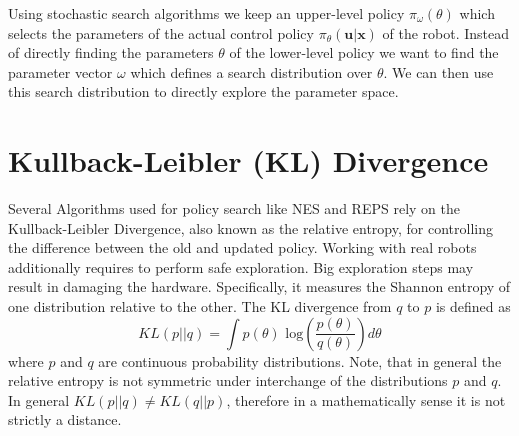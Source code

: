 Using stochastic search algorithms we keep an upper-level policy
$\pi_{\omega}(\theta)$ which selects the parameters of the
actual control policy $\pi_{\theta}(\mathbf{u} | \mathbf{x})$ of the robot.
Instead of directly finding the parameters $\theta$ of the
lower-level policy we want to find the parameter vector $\omega$ which
defines a search distribution over $\theta$. We can then use this
search distribution to directly explore the parameter space.


\section{Kullback-Leibler (KL) Divergence}
Several Algorithms used for policy search like
NES \citep{wierstra2014natural} and REPS \citep{peters2010relative}
rely on the Kullback-Leibler Divergence, also
known as the relative entropy, for controlling
the difference between the old and updated policy.
Working with real robots additionally requires to perform safe exploration. Big
exploration steps may result in damaging the hardware.
Specifically, it measures the Shannon entropy of one distribution relative to the
other. The KL divergence from $q$ to $p$ is defined as
$$ KL(p || q) = \int p(\theta) \text{ log} \left(\frac{p(\theta)}{q(\theta)}\right)
d \theta $$
where $p$ and $q$ are continuous probability distributions.
Note, that in general the relative entropy is not symmetric under interchange of the
distributions $p$ and $q$. In general $KL(p || q) \neq KL(q || p) $, therefore
in a mathematically sense it is not strictly a distance.

%
%
%
%
%
%

